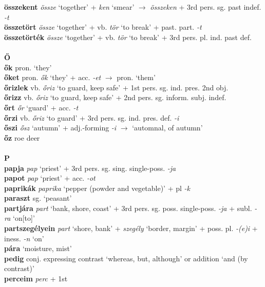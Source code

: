 \documentclass[11pt]{article}
\begin{document}
\textbf{összekent} \emph{össze} `together' + \emph{ken} `smear'
$\rightarrow$ \emph{összeken} + 3rd pers. sg. past indef. \emph{-t} \\
\textbf{összetört} \emph{össze} `together' + vb. \emph{tör} `to break'
+ past. part. \emph{-t} \\
\textbf{összetörték} \emph{össze} `together' + vb. \emph{tör} `to
break' + 3rd pers. pl. ind. past def. \\
\ \\
\noindent \textbf{\large Ő} \\
\textbf{ők} pron. `they' \\
\textbf{őket} pron. \emph{ők} `they' + acc. \emph{-et} $\rightarrow$
pron. `them' \\
\textbf{őrizlek} vb. \emph{őriz} `to guard, keep safe' + 1st pers. sg. ind. pres. 2nd obj. \\
\textbf{őrizz} vb. \emph{őriz} `to guard, keep safe' + 2nd
pers. sg. inform. subj. indef. \\
\textbf{őrt} \emph{őr} `guard' + acc. \emph{-t} \\
\textbf{őrzi} vb. \emph{őriz} `to guard' + 3rd
pers. sg. ind. pres. def. \emph{-i} \\
\textbf{őszi} \emph{ősz} `autumn' + adj.\hyp{}forming \emph{-i}
$\rightarrow$ `automnal, of autumn' \\
\textbf{őz} roe deer \\
\ \\
\noindent \textbf{\large P} \\
\textbf{papja} \emph{pap} `priest' + 3rd
pers. sg. sing. single\hyp{}poss. \emph{-ja} \\
\textbf{papot} \emph{pap} `priest' + acc. \emph{-ot} \\
\textbf{paprikák} \emph{paprika} `pepper (powder and vegetable)' +
pl \emph{-k} \\
\textbf{paraszt} sg. `peasant'\\
\textbf{partjára} \emph{part} `bank, shore, coast' + 3rd
pers. sg. poss. single\hyp{}poss. \emph{-ja} + subl. \emph{-ra}
`on[to]' \\
\textbf{partszegélyein} \emph{part} `shore, bank' + \emph{szegély}
`border, margin' + poss. pl. \emph{-(e)i} + iness. \emph{-n} `on' \\
\textbf{pára} `moisture, mist' \\
\textbf{pedig} conj. expressing contrast `whereas, but, although' or
addition `and (by contrast)' \\
\textbf{perceim} \emph{perc} + 1st
\end{document}
